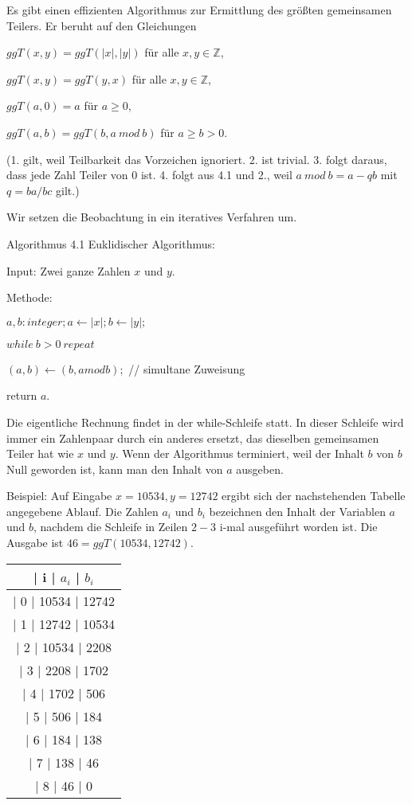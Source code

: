 \documentclass[a4paper]{article}
\begin{document}
\begin{multicols}{3}
    Es gibt einen effizienten Algorithmus zur Ermittlung des größten gemeinsamen Teilers. Er beruht auf den Gleichungen
    \begin{enumerate*}
        \item $ggT(x,y) = ggT(|x|,|y|)$ für alle $x,y\in\mathbb{Z}$,
        \item $ggT(x,y) = ggT(y,x)$ für alle $x,y\in\mathbb{Z}$,
        \item $ggT(a,0) =a$ für $a\geq 0$,
        \item $ggT(a,b) = ggT(b,a\ mod\ b)$ für $a\geq b >0$.
    \end{enumerate*}

    (1. gilt, weil Teilbarkeit das Vorzeichen ignoriert. 2. ist trivial. 3. folgt daraus, dass jede Zahl Teiler von $0$ ist. 4. folgt aus 4.1 und 2., weil $a\ mod\ b=a-qb$ mit $q=ba/bc$ gilt.)

    Wir setzen die Beobachtung in ein iteratives Verfahren um.

    Algorithmus 4.1 Euklidischer Algorithmus:
    \begin{itemize*}
        \item Input: Zwei ganze Zahlen $x$ und $y$.
        \item Methode:
        \begin{enumerate*}
            \item $a,b:integer;a\leftarrow |x|;b\leftarrow |y|;$
            \item $while\ b> 0\ repeat$
            \item $(a,b)\leftarrow (b,amodb);$ // simultane Zuweisung
            \item return $a$.
        \end{enumerate*}
    \end{itemize*}

    Die eigentliche Rechnung findet in der while-Schleife statt. In dieser Schleife wird immer ein Zahlenpaar durch ein anderes ersetzt, das dieselben gemeinsamen Teiler hat wie $x$ und $y$. Wenn der Algorithmus terminiert, weil der Inhalt $b$ von $b$ Null geworden ist, kann man den Inhalt von $a$ ausgeben.

    Beispiel: Auf Eingabe $x=10534, y=12742$ ergibt sich der nachstehenden Tabelle angegebene Ablauf. Die Zahlen $a_i$ und $b_i$ bezeichnen den Inhalt der Variablen $a$ und $b$, nachdem die Schleife in Zeilen $2-3$ i-mal ausgeführt worden ist. Die Ausgabe ist $46 = ggT(10534,12742)$.
    \begin{tabular}{c}
    | i  | $a_i$ | $b_i$ \\\hline
    | 0  | 10534 | 12742 \\
    | 1  | 12742 | 10534 \\
    | 2  | 10534 | 2208 \\
    | 3  | 2208 | 1702 \\
    | 4  | 1702 | 506  \\
    | 5  | 506  | 184  \\
    | 6  | 184  | 138  \\
    | 7  | 138  | 46  \\
    | 8  | 46  | 0   
    \end{tabular}



\end{multicols}
\end{document}
